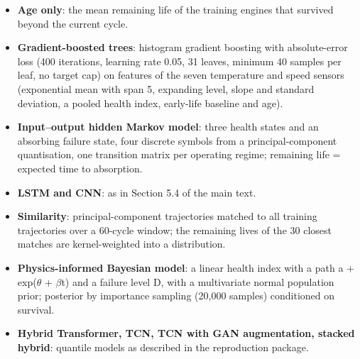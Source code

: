 \documentclass[11pt,a4paper]{article}
\begin{document}
\begin{itemize}[leftmargin=1.2em,itemsep=2pt]
\item \textbf{Age only}: the mean remaining life of the training engines that survived beyond the current cycle.
\item \textbf{Gradient-boosted trees}: histogram gradient boosting with absolute-error loss (400 iterations, learning rate 0.05, 31 leaves, minimum 40 samples per leaf, no target cap) on features of the seven temperature and speed sensors (exponential mean with span 5, expanding level, slope and standard deviation, a pooled health index, early-life baseline and age).
\item \textbf{Input--output hidden Markov model}: three health states and an absorbing failure state, four discrete symbols from a principal-component quantisation, one transition matrix per operating regime; remaining life = expected time to absorption.
\item \textbf{LSTM and CNN}: as in Section 5.4 of the main text.
\item \textbf{Similarity}: principal-component trajectories matched to all training trajectories over a 60-cycle window; the remaining lives of the 30 closest matches are kernel-weighted into a distribution.
\item \textbf{Physics-informed Bayesian model}: a linear health index with a path a + exp($\theta$ + $\beta$t) and a failure level D, with a multivariate normal population prior; posterior by importance sampling (20,000 samples) conditioned on survival.
\item \textbf{Hybrid Transformer, TCN, TCN with GAN augmentation, stacked hybrid}: quantile models as described in the reproduction package.
\end{itemize}
\end{document}
